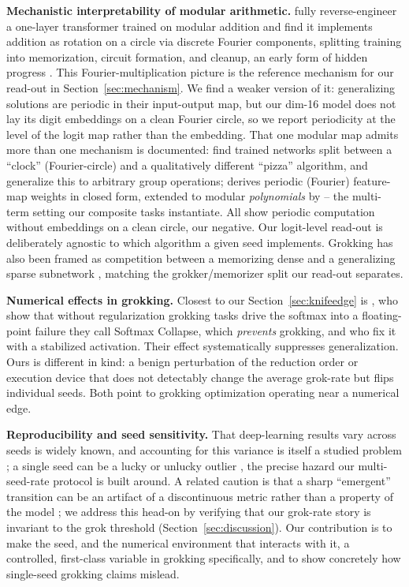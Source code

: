 \documentclass[10pt]{article} %
\begin{document}
\textbf{Mechanistic interpretability of modular arithmetic.} \citet{nanda2023progress} fully
reverse-engineer a one-layer transformer trained on modular addition and find it implements
addition as rotation on a circle via discrete Fourier components, splitting training into
memorization, circuit formation, and cleanup, an early form of hidden progress
\citep{barak2022hidden}. This Fourier-multiplication picture is the
reference mechanism for our read-out in Section~\ref{sec:mechanism}. We find a weaker version of
it: generalizing solutions are periodic in their input-output map, but our dim-16 model does not
lay its digit embeddings on a clean Fourier circle, so we report periodicity at the level of the
logit map rather than the embedding. That one modular map admits more than one mechanism is documented: \citet{zhong2023clock} find
trained networks split between a ``clock'' (Fourier-circle) and a qualitatively different ``pizza''
algorithm, and \citet{chughtai2023toy} generalize this to arbitrary group operations;
\citet{gromov2023grokking} derives periodic (Fourier) feature-map weights in closed form, extended to
modular \emph{polynomials} by \citet{doshi2024polynomials} -- the multi-term setting our composite
tasks instantiate. All show periodic computation without embeddings on a clean circle, our negative. Our logit-level read-out is deliberately agnostic to which
algorithm a given seed implements.
Grokking has also been framed as competition between a memorizing dense and a generalizing sparse
subnetwork \citep{merrill2023two}, matching the grokker/memorizer split our read-out separates.

\textbf{Numerical effects in grokking.} Closest to our Section~\ref{sec:knifeedge} is
\citet{prieto2025edge}, who show that without regularization grokking tasks drive the softmax into
a floating-point failure they call Softmax Collapse, which \emph{prevents} grokking, and who fix
it with a stabilized activation. Their effect systematically suppresses generalization. Ours is
different in kind: a benign perturbation of the
reduction order or execution device that does not detectably change the average grok-rate but flips
individual seeds. Both point to grokking optimization operating near a numerical edge.

\textbf{Reproducibility and seed sensitivity.} That deep-learning results vary across seeds is
widely known, and accounting for this variance is itself a studied problem
\citep{bouthillier2021variance}; a single seed can be a lucky or unlucky outlier
\citep{picard2021torch}, the precise hazard our multi-seed-rate protocol is built around. A related
caution is that a sharp ``emergent'' transition can be
an artifact of a discontinuous metric rather than a property of the model
\citep{schaeffer2023mirage}; we address this head-on by verifying that our grok-rate story is
invariant to the grok threshold (Section~\ref{sec:discussion}). Our contribution is to make the
seed, and the numerical environment that interacts with it, a controlled, first-class variable in
grokking specifically, and to show concretely how single-seed grokking claims mislead.
\end{document}
